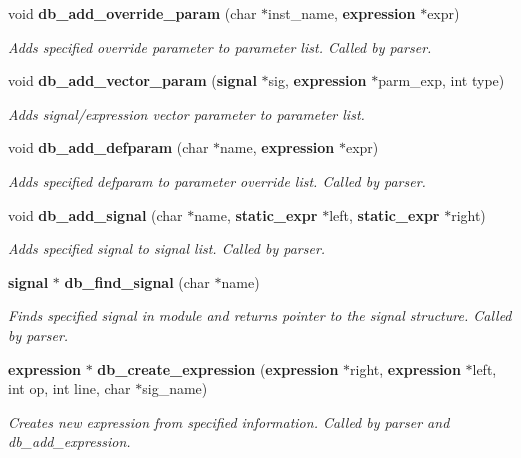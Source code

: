 \begin{CompactItemize}
void {\bf db\_\-add\_\-override\_\-param} (char $\ast$inst\_\-name, {\bf expression} $\ast$expr)
\begin{CompactList}\small\item\em Adds specified override parameter to parameter list. Called by parser. \item\end{CompactList}\item 
void {\bf db\_\-add\_\-vector\_\-param} ({\bf signal} $\ast$sig, {\bf expression} $\ast$parm\_\-exp, int type)
\begin{CompactList}\small\item\em Adds signal/expression vector parameter to parameter list. \item\end{CompactList}\item 
void {\bf db\_\-add\_\-defparam} (char $\ast$name, {\bf expression} $\ast$expr)
\begin{CompactList}\small\item\em Adds specified defparam to parameter override list. Called by parser. \item\end{CompactList}\item 
void {\bf db\_\-add\_\-signal} (char $\ast$name, {\bf static\_\-expr} $\ast$left, {\bf static\_\-expr} $\ast$right)
\begin{CompactList}\small\item\em Adds specified signal to signal list. Called by parser. \item\end{CompactList}\item 
{\bf signal} $\ast$ {\bf db\_\-find\_\-signal} (char $\ast$name)
\begin{CompactList}\small\item\em Finds specified signal in module and returns pointer to the signal structure. Called by parser. \item\end{CompactList}\item 
{\bf expression} $\ast$ {\bf db\_\-create\_\-expression} ({\bf expression} $\ast$right, {\bf expression} $\ast$left, int op, int line, char $\ast$sig\_\-name)
\begin{CompactList}\small\item\em Creates new expression from specified information. Called by parser and db\_\-add\_\-expression. \item\end{CompactList}\item 

\end{CompactItemize}
